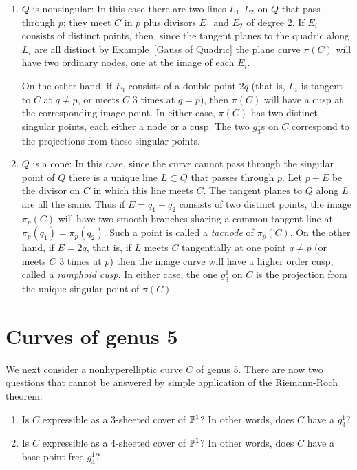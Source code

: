 \begin{enumerate}
\item $Q$ is nonsingular:
In this case there are two lines $L_1, L_2$ on $Q$ that pass through $p$; they meet $C$ in $p$ plus divisors $E_1$ and $E_2$ of degree 2. If $E_i$ consists of distinct points, then, since the tangent planes to the quadric along $L_i$ are all distinct by Example~\ref{Gauss of Quadric} the plane curve $\pi(C)$ will have two ordinary nodes, one at the image of each $E_i$.

On the other hand, if $E_i$ consists of a double point $2q$ (that is, $L_i$ is tangent to $C$ at $q\neq p$, or meets $C$ 3 times at $q = p$), then $\pi(C)$ will have a cusp at the corresponding image point. 
In either case, $\pi(C)$ has two distinct singular points, each either a node or a cusp. The two $g^1_3$s on $C$ correspond to the projections from these singular points.

\item $Q$ is a cone:
In this case, since the curve cannot pass through the singular point of $Q$ there is a unique line $L\subset Q$ that passes through $p$. Let $p+E$ be the divisor on $C$ in which this line meets $C$. The tangent planes to $Q$ along $L$ are all the same. Thus if $E = q_1+q_2$ consists of two distinct points, the image $\pi_p(C)$ will have two smooth branches sharing a common tangent line at
$\pi_p(q_1) = \pi_p(q_2)$. Such a point is called a \emph{tacnode} of $\pi_p(C)$. On the other hand, if $E= 2q$, that is, if $L$ meets $C$ tangentially at one point $q\neq p$ (or meets $C$ 3 times at $p$) then the image curve will have a higher order cusp, called a \emph{ramphoid cusp}. In either case, the one $g^1_3$ on $C$ is the projection from the unique singular point of $\pi(C)$.
\end{enumerate}



\section{Curves of genus 5}

We next consider a nonhyperelliptic curve $C$ of genus 5. There are now two questions that cannot be answered by simple application of the Riemann-Roch theorem:

\begin{enumerate}
\item Is $C$ expressible as a 3-sheeted cover of ${\mathbb P}^1$? In other words, does $C$ have a $g^1_3$?
\item Is $C$ expressible as a 4-sheeted cover of ${\mathbb P}^1$? In other words, does $C$ have a base-point-free $g^1_4$?
\end{enumerate}

